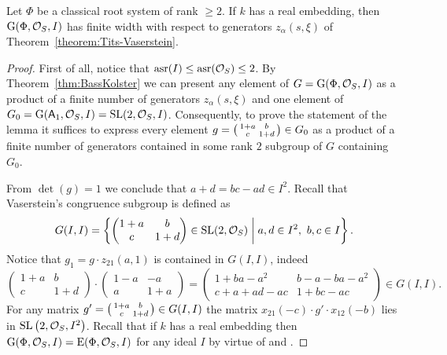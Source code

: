 \begin{lemma}
Let $\Phi$ be a classical root system of rank $\geqslant 2$.
If $k$ has a real embedding, then $\operatorname{G}(\Phi,\mathcal{O}_S,I)$ has finite width with respect to generators $z_\alpha(s, \xi)$ of Theorem~\ref{theorem:Tits-Vaserstein}.
\end{lemma}
\begin{proof}
First of all, notice that $\operatorname{asr}(I) \leq \operatorname{asr}(\mathcal{O}_S) \leq 2$. 
By Theorem~\ref{thm:BassKolster} we can present any element of $G=\operatorname{G}(\Phi, \mathcal{O}_S, I)$ as a product of a finite number of generators $z_\alpha(s, \xi)$ and one element of $G_0=\operatorname{G}(\mathsf{A}_1, \mathcal{O}_S, I)=\operatorname{SL}(2,\mathcal{O}_S,I)$.
Consequently, to prove the statement of the lemma it suffices to express every element $g = \begin{psmallmatrix}1+a & b \\ c & 1+d \end{psmallmatrix} \in G_0$ as a product of a finite number of generators contained in some rank $2$ subgroup of $G$ containing $G_0$.

From $\det(g)=1$ we conclude that $a+d=bc-ad\in I^2$. 
Recall that Vaserstein's congruence subgroup is defined as
\[ G(I,I)=\left\{ \begin{pmatrix}1+a & b \\ c & 1+d\end{pmatrix}\in\SL(2,\mathcal{O}_S)\;\middle|\; a,d\in I^2,\ b,c\in I \right\}. \]
Notice that $g_1=g\cdot z_{21}(a,1)$ is contained in $G(I,I)$, indeed
\[ \begin{pmatrix} 1+a & b \\ c & 1+d \end{pmatrix} \cdot \begin{pmatrix} 1-a & -a \\ a & 1+a \end{pmatrix} = \begin{pmatrix} 1+ba-a^2 & b-a-ba-a^2 \\ c+a+ad-ac & 1+bc-ac \end{pmatrix} \in G(I,I). \]
For any matrix $g'=\begin{psmallmatrix}1+a & b \\ c & 1+d\end{psmallmatrix}\in G(I,I)$ the matrix $x_{21}(-c)\cdot g'\cdot x_{12}(-b)$ lies in $\operatorname{SL}\left(2,\mathcal{O}_S,I^2\right)$.
Recall that if $k$ has a real embedding then $\operatorname{G}(\Phi, \mathcal{O}_S,I) = \operatorname{E}(\Phi, \mathcal{O}_S, I)$ for any ideal $I$ by virtue of \cite[Corollary~4.5]{Ma69} and \cite[Theorem~3.6]{BassMilnorSerre}.


\end{proof}
